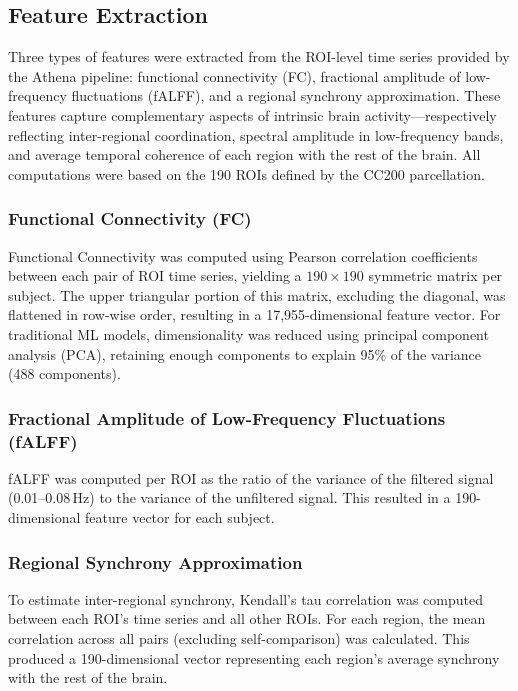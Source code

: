 \documentclass[conference]{IEEEtran}
\begin{document}
\subsection{Feature Extraction}
Three types of features were extracted from the ROI-level time series provided by the Athena pipeline: functional connectivity (FC), fractional amplitude of low-frequency fluctuations (fALFF), and a regional synchrony approximation. These features capture complementary aspects of intrinsic brain activity---respectively reflecting inter-regional coordination, spectral amplitude in low-frequency bands, and average temporal coherence of each region with the rest of the brain. All computations were based on the 190 ROIs defined by the CC200 parcellation.

\subsubsection{Functional Connectivity (FC)}
Functional Connectivity was computed using Pearson correlation coefficients between each pair of ROI time series, yielding a $190 \times 190$ symmetric matrix per subject. The upper triangular portion of this matrix, excluding the diagonal, was flattened in row-wise order, resulting in a 17,955-dimensional feature vector. For traditional ML models, dimensionality was reduced using principal component analysis (PCA), retaining enough components to explain 95\% of the variance (488 components).

\subsubsection{Fractional Amplitude of Low-Frequency Fluctuations (fALFF)}
fALFF was computed per ROI as the ratio of the variance of the filtered signal (0.01--0.08\,Hz) to the variance of the unfiltered signal. This resulted in a 190-dimensional feature vector for each subject.

\subsubsection{Regional Synchrony Approximation}
To estimate inter-regional synchrony, Kendall's tau correlation was computed between each ROI's time series and all other ROIs. For each region, the mean correlation across all pairs (excluding self-comparison) was calculated. This produced a 190-dimensional vector representing each region's average synchrony with the rest of the brain.
\end{document}
